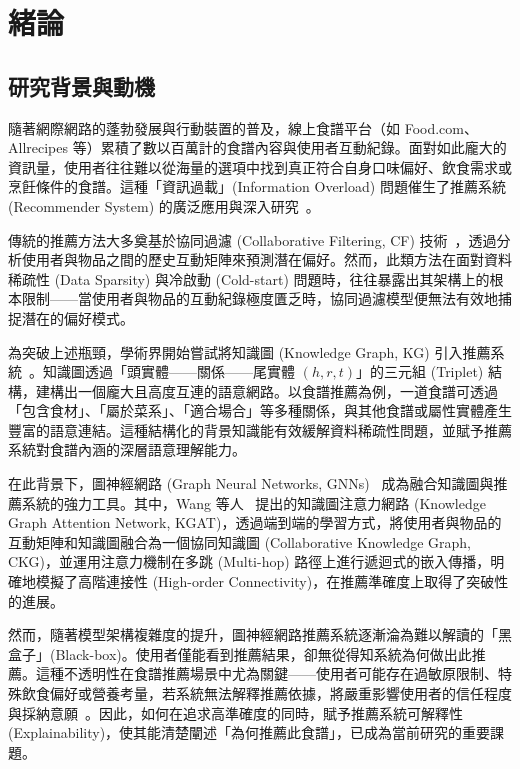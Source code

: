 
\chapter{緒論}

\section{研究背景與動機}

隨著網際網路的蓬勃發展與行動裝置的普及，線上食譜平台（如 Food.com、Allrecipes 等）累積了數以百萬計的食譜內容與使用者互動紀錄。面對如此龐大的資訊量，使用者往往難以從海量的選項中找到真正符合自身口味偏好、飲食需求或烹飪條件的食譜。這種「資訊過載」(Information Overload) 問題催生了推薦系統 (Recommender System) 的廣泛應用與深入研究~\cite{su2009survey}。

傳統的推薦方法大多奠基於協同過濾 (Collaborative Filtering, CF) 技術~\cite{koren2009matrix}，透過分析使用者與物品之間的歷史互動矩陣來預測潛在偏好。然而，此類方法在面對資料稀疏性 (Data Sparsity) 與冷啟動 (Cold-start) 問題時，往往暴露出其架構上的根本限制——當使用者與物品的互動紀錄極度匱乏時，協同過濾模型便無法有效地捕捉潛在的偏好模式。

為突破上述瓶頸，學術界開始嘗試將知識圖 (Knowledge Graph, KG) 引入推薦系統~\cite{wang2018ripplenet, wang2019kgcn}。知識圖透過「頭實體——關係——尾實體 $(h, r, t)$」的三元組 (Triplet) 結構，建構出一個龐大且高度互連的語意網路。以食譜推薦為例，一道食譜可透過「包含食材」、「屬於菜系」、「適合場合」等多種關係，與其他食譜或屬性實體產生豐富的語意連結。這種結構化的背景知識能有效緩解資料稀疏性問題，並賦予推薦系統對食譜內涵的深層語意理解能力。

在此背景下，圖神經網路 (Graph Neural Networks, GNNs)~\cite{kipf2017gcn, velickovic2018gat} 成為融合知識圖與推薦系統的強力工具。其中，Wang 等人~\cite{wang2019kgat} 提出的知識圖注意力網路 (Knowledge Graph Attention Network, KGAT)，透過端到端的學習方式，將使用者與物品的互動矩陣和知識圖融合為一個協同知識圖 (Collaborative Knowledge Graph, CKG)，並運用注意力機制在多跳 (Multi-hop) 路徑上進行遞迴式的嵌入傳播，明確地模擬了高階連接性 (High-order Connectivity)，在推薦準確度上取得了突破性的進展。

然而，隨著模型架構複雜度的提升，圖神經網路推薦系統逐漸淪為難以解讀的「黑盒子」(Black-box)。使用者僅能看到推薦結果，卻無從得知系統為何做出此推薦。這種不透明性在食譜推薦場景中尤為關鍵——使用者可能存在過敏原限制、特殊飲食偏好或營養考量，若系統無法解釋推薦依據，將嚴重影響使用者的信任程度與採納意願~\cite{zhang2020explainable}。因此，如何在追求高準確度的同時，賦予推薦系統可解釋性 (Explainability)，使其能清楚闡述「為何推薦此食譜」，已成為當前研究的重要課題。

